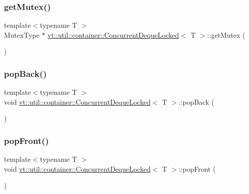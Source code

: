 \subsubsection{\texorpdfstring{get\+Mutex()}{getMutex()}}
{\footnotesize\ttfamily template$<$typename T $>$ \\
Mutex\+Type $\ast$ \hyperlink{structvt_1_1util_1_1container_1_1_concurrent_deque_locked}{vt\+::util\+::container\+::\+Concurrent\+Deque\+Locked}$<$ T $>$\+::get\+Mutex (\begin{DoxyParamCaption}{ }\end{DoxyParamCaption})\hspace{0.3cm}{\ttfamily [private]}}

\mbox{\label{structvt_1_1util_1_1container_1_1_concurrent_deque_locked_af5c7291d01a60ba4ea5e773de4c2b8e3}} 
\subsubsection{\texorpdfstring{pop\+Back()}{popBack()}}
{\footnotesize\ttfamily template$<$typename T $>$ \\
void \hyperlink{structvt_1_1util_1_1container_1_1_concurrent_deque_locked}{vt\+::util\+::container\+::\+Concurrent\+Deque\+Locked}$<$ T $>$\+::pop\+Back (\begin{DoxyParamCaption}{ }\end{DoxyParamCaption})}

\mbox{\label{structvt_1_1util_1_1container_1_1_concurrent_deque_locked_a24d80e8f7e30a18175f390e79f061a99}} 
\subsubsection{\texorpdfstring{pop\+Front()}{popFront()}}
{\footnotesize\ttfamily template$<$typename T $>$ \\
void \hyperlink{structvt_1_1util_1_1container_1_1_concurrent_deque_locked}{vt\+::util\+::container\+::\+Concurrent\+Deque\+Locked}$<$ T $>$\+::pop\+Front (\begin{DoxyParamCaption}{ }\end{DoxyParamCaption})}

